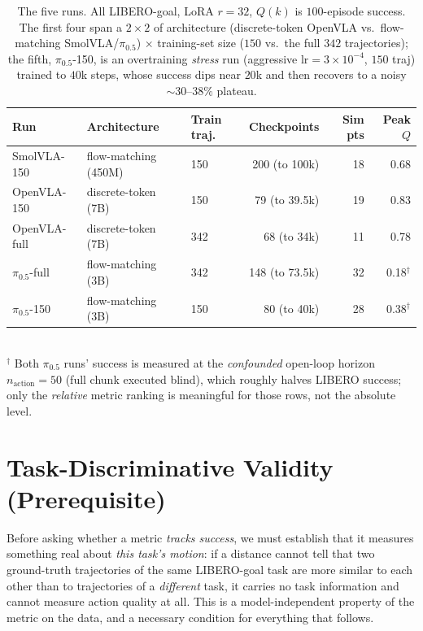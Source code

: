 \documentclass[11pt]{article}
\begin{document}
\begin{table}[h]
\centering
\caption{The five runs. All LIBERO-goal, LoRA $r{=}32$, $Q(k)$ is $100$-episode success. The first four
span a $2\times2$ of architecture (discrete-token OpenVLA vs.\ flow-matching SmolVLA/$\pi_{0.5}$)
$\times$ training-set size ($150$ vs.\ the full $342$ trajectories); the fifth, $\pi_{0.5}$-150, is an
overtraining \emph{stress} run (aggressive $\text{lr}{=}3\!\times\!10^{-4}$, $150$ traj) trained to $40$k
steps, whose success dips near $20$k and then recovers to a noisy $\sim\!30$--$38\%$ plateau.}
\begin{tabular}{lllrrr}
\toprule
Run & Architecture & Train traj. & Checkpoints & Sim pts & Peak $Q$ \\
\midrule
SmolVLA-150      & flow-matching (450M) & 150 & 200 (to 100k) & 18 & 0.68 \\
OpenVLA-150      & discrete-token (7B)  & 150 & 79 (to 39.5k) & 19 & 0.83 \\
OpenVLA-full     & discrete-token (7B)  & 342 & 68 (to 34k)   & 11 & 0.78 \\
$\pi_{0.5}$-full & flow-matching (3B)   & 342 & 148 (to 73.5k)& 32 & 0.18$^\dagger$ \\
$\pi_{0.5}$-150  & flow-matching (3B)   & 150 & 80 (to 40k)   & 28 & 0.38$^\dagger$ \\
\bottomrule
\end{tabular}
\\[2pt]
{\footnotesize $^\dagger$ Both $\pi_{0.5}$ runs' success is measured at the \emph{confounded} open-loop
horizon $n_{\text{action}}{=}50$ (full chunk executed blind), which roughly halves LIBERO success; only
the \emph{relative} metric ranking is meaningful for those rows, not the absolute level.}
\end{table}

\section{Task-Discriminative Validity (Prerequisite)}

Before asking whether a metric \emph{tracks success}, we must establish that it measures something
real about \emph{this task's motion}: if a distance cannot tell that two ground-truth trajectories of
the same LIBERO-goal task are more similar to each other than to trajectories of a \emph{different}
task, it carries no task information and cannot measure action quality at all. This is a
model-independent property of the metric on the data, and a necessary condition for everything that
follows.
\end{document}
